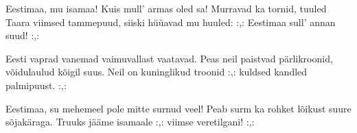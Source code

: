 Eestimaa, mu isamaa!
Kuis mull' armas oled sa!
Murravad ka tornid, tuuled
Taara viimsed tammepuud,
siiski h\"u\"uavad mu huuled:
:,: Eestimaa sull' annan suud! :,:

Eesti vaprad vanemad
vaimuvallast vaatavad.
Peas neil paistvad p\"arlikroonid,
v\~oidulaulud k\~oigil suus.
Neil on kuninglikud troonid
:,: kuldsed kandled palmipuust. :,:

Eestimaa, su mehemeel
pole mitte surnud veel!
Peab surm ka rohket l\~oikust
suure s\~ojak\"araga.
Truuks j\"a\"ame isamaale
:,: viimse veretilgani! :,:
\clearpage